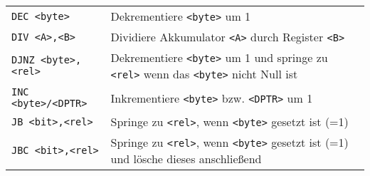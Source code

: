 \begin{longtable}[c]{@{}ll@{}}
\begin{minipage}[t]{0.25\columnwidth}
\texttt{DEC <byte>}
\strut\end{minipage} & \begin{minipage}[t]{0.69\columnwidth}\raggedright\strut
Dekrementiere \texttt{<byte>} um 1
\strut\end{minipage}\tabularnewline
\begin{minipage}[t]{0.25\columnwidth}\raggedright\strut
\texttt{DIV <A>,<B>}
\strut\end{minipage} & \begin{minipage}[t]{0.69\columnwidth}\raggedright\strut
Dividiere Akkumulator \texttt{<A>} durch Register \texttt{<B>}
\strut\end{minipage}\tabularnewline
\begin{minipage}[t]{0.25\columnwidth}\raggedright\strut
\texttt{DJNZ <byte>,<rel>}
\strut\end{minipage} & \begin{minipage}[t]{0.69\columnwidth}\raggedright\strut
Dekrementiere \texttt{<byte>} um 1 und springe zu \texttt{<rel>} wenn das \texttt{<byte>}
nicht Null ist
\strut\end{minipage}\tabularnewline
\begin{minipage}[t]{0.25\columnwidth}\raggedright\strut
\texttt{INC <byte>/<DPTR>}
\strut\end{minipage} & \begin{minipage}[t]{0.69\columnwidth}\raggedright\strut
Inkrementiere \texttt{<byte>} bzw. \texttt{<DPTR>} um 1
\strut\end{minipage}\tabularnewline
\begin{minipage}[t]{0.25\columnwidth}\raggedright\strut
\texttt{JB <bit>,<rel>}
\strut\end{minipage} & \begin{minipage}[t]{0.69\columnwidth}\raggedright\strut
Springe zu \texttt{<rel>}, wenn \texttt{<byte>} gesetzt ist (=1)
\strut\end{minipage}\tabularnewline
\begin{minipage}[t]{0.25\columnwidth}\raggedright\strut
\texttt{JBC <bit>,<rel>}
\strut\end{minipage} & \begin{minipage}[t]{0.69\columnwidth}\raggedright\strut
Springe zu \texttt{<rel>}, wenn \texttt{<byte>} gesetzt ist (=1) und lösche dieses
anschließend
\strut\end{minipage}\tabularnewline

\end{longtable}
